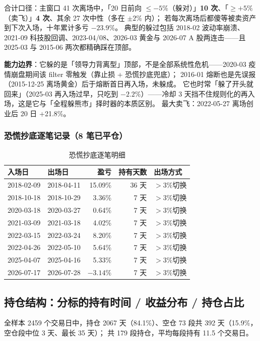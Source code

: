 \documentclass[11pt]{ctexart}
\newcommand{\pos}[1]{\textcolor{poscol}{#1}}   %
\newcommand{\red}[1]{\textcolor{accent}{#1}}   %
\begin{document}
合计口径：主窗口 41 次离场中，「20 日前向 $\le-5\%$（躲对）」\textbf{10 次}、「$\ge+5\%$（卖飞）」\textbf{4 次}、其余 27 次中性（多在 $\pm2\%$ 内）；
若每次离场后都傻等被卖资产到下次入场，十年累计多亏 $-23.9\%$。
典型的躲过包括 2018-02 波动率崩溃、2021-09 科技股回调、2023-04/08、2026-03 黄金与 2026-07 A 股两连击——且 2025-03 与 2015-06 两次都精确踩在顶部。

\textbf{能力边界}：它躲的是「领导力背离型」顶部，不是全部系统性危机——2020-03 疫情崩盘期间该 filter 零触发（靠止损 + 恐慌抄底兜底）；
2016-01 熔断也是先误报（2015-12-25 离场黄金）后于熔断首日再入场，未躲成。
它也时常「躲了开头就回来」（2025-03 再入场过早，只吃到 $-2.2\%$）——冷却 3 天挡不住规则化的再入场，这是它与「全程躲熊市」择时器的本质区别。
最大卖飞：2022-05-27 离场创业后 20 日 +21.8\%。

\subsubsection{恐慌抄底逐笔记录（8 笔已平仓）}

\begin{table}[htbp]
\centering
\caption{恐慌抄底逐笔明细}
\begin{tabular}{llrrl}
\toprule
入场日 & 出场日 & 盈亏 & 持有天数 & 出场方式 \\
\midrule
2018-02-09 & 2018-04-11 & \pos{15.09\%} & 36 天 & $>3\%$切换 \\
2018-10-18 & 2018-10-29 & \pos{3.36\%} & 7 天 & $>3\%$切换 \\
2020-03-18 & 2020-03-27 & \pos{0.64\%} & 7 天 & $>3\%$切换 \\
2021-03-09 & 2021-03-18 & \pos{4.02\%} & 7 天 & $>3\%$切换 \\
2022-03-15 & 2022-03-24 & \pos{8.20\%} & 7 天 & $>3\%$切换 \\
2022-04-26 & 2022-05-10 & \pos{5.64\%} & 7 天 & $>3\%$切换 \\
2025-04-07 & 2025-04-16 & \pos{5.33\%} & 7 天 & $>3\%$切换 \\
2026-07-17 & 2026-07-28 & \red{$-3.14\%$} & 7 天 & $>3\%$切换 \\
\bottomrule
\end{tabular}
\end{table}

\subsection{持仓结构：分标的持有时间 / 收益分布 / 持仓占比}

全样本 2459 个交易日中，持仓 2067 天（84.1\%）、空仓 73 段共 392 天（15.9\%，空仓段中位 3 天、最长 35 天）；
共 179 段持仓，平均每段持有 11.5 个交易日。
\end{document}
